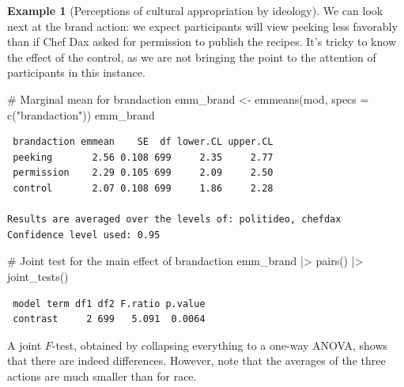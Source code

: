 \documentclass[
  11pt,
  letterpaper,
]{scrbook}
\newenvironment{Shaded}{\begin{snugshade}}{\end{snugshade}}
\newcommand{\AttributeTok}[1]{\textcolor[rgb]{0.40,0.45,0.13}{#1}}
\newcommand{\CommentTok}[1]{\textcolor[rgb]{0.37,0.37,0.37}{#1}}
\newcommand{\FunctionTok}[1]{\textcolor[rgb]{0.28,0.35,0.67}{#1}}
\newcommand{\NormalTok}[1]{\textcolor[rgb]{0.00,0.23,0.31}{#1}}
\newcommand{\OtherTok}[1]{\textcolor[rgb]{0.00,0.23,0.31}{#1}}
\newcommand{\SpecialCharTok}[1]{\textcolor[rgb]{0.37,0.37,0.37}{#1}}
\newcommand{\StringTok}[1]{\textcolor[rgb]{0.13,0.47,0.30}{#1}}
\theoremstyle{definition}
\newtheorem{example}{Example}[chapter]
\theoremstyle{definition}
\theoremstyle{remark}
\begin{document}
\begin{example}[Perceptions of cultural appropriation by
ideology]
We can look next at the brand action: we expect participants will view
peeking less favorably than if Chef Dax asked for permission to publish
the recipes. It's tricky to know the effect of the control, as we are
not bringing the point to the attention of participants in this
instance.

\begin{Shaded}
\begin{Highlighting}[]
\CommentTok{\# Marginal mean for brandaction}
\NormalTok{emm\_brand }\OtherTok{\textless{}{-}} \FunctionTok{emmeans}\NormalTok{(mod, }\AttributeTok{specs =} \FunctionTok{c}\NormalTok{(}\StringTok{"brandaction"}\NormalTok{)) }
\NormalTok{emm\_brand}
\end{Highlighting}
\end{Shaded}

\begin{verbatim}
 brandaction emmean    SE  df lower.CL upper.CL
 peeking       2.56 0.108 699     2.35     2.77
 permission    2.29 0.105 699     2.09     2.50
 control       2.07 0.108 699     1.86     2.28

Results are averaged over the levels of: politideo, chefdax 
Confidence level used: 0.95 
\end{verbatim}

\begin{Shaded}
\begin{Highlighting}[]
\CommentTok{\# Joint test for the main effect of brandaction}
\NormalTok{emm\_brand }\SpecialCharTok{|\textgreater{}} \FunctionTok{pairs}\NormalTok{() }\SpecialCharTok{|\textgreater{}} \FunctionTok{joint\_tests}\NormalTok{()}
\end{Highlighting}
\end{Shaded}

\begin{verbatim}
 model term df1 df2 F.ratio p.value
 contrast     2 699   5.091  0.0064
\end{verbatim}

A joint \(F\)-test, obtained by collapsing everything to a one-way
ANOVA, shows that there are indeed differences. However, note that the
averages of the three actions are much smaller than for race.

\end{example}
\end{document}
